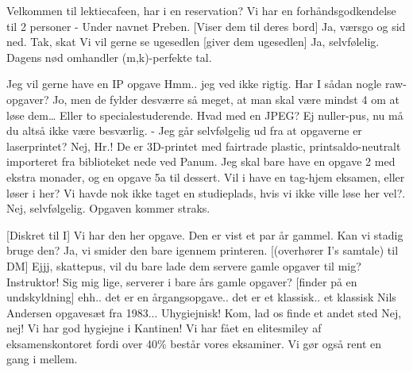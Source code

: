\documentclass[a4paper,11pt]{article}
\begin{document}
\begin{sketch}




 Velkommen til lektiecafeen, har i en reservation?
 Vi har en forhåndsgodkendelse til 2 personer - Under navnet Preben.
[Viser dem til deres bord] Ja, værsgo og sid ned.
 Tak, skat
 Vi vil gerne se ugesedlen
[giver dem ugesedlen] Ja, selvfølelig. Dagens nød omhandler (m,k)-perfekte tal.

 Jeg vil gerne have en IP opgave
 Hmm.. jeg ved ikke rigtig. Har I sådan nogle raw-opgaver?
 Jo, men de fylder desværre så meget, at man skal være mindst 4 om at løse dem\ldots
         Eller to specialestuderende. Hvad med en JPEG?
 Ej nuller-pus, nu må du altså ikke være besværlig. - Jeg går
selvfølgelig ud fra at opgaverne er laserprintet?
 Nej, Hr.! De er 3D-printet med fairtrade plastic, printsaldo-neutralt importeret
         fra biblioteket nede ved Panum.
 Jeg skal bare have en opgave 2 med ekstra monader, og en opgave 5a til dessert.
 Vil i have en tag-hjem eksamen, eller løser i her?
 Vi havde nok ikke taget en studieplads, hvis vi ikke ville løse her vel?.
 Nej, selvfølgelig. Opgaven kommer straks.

[Diskret til I] Vi har den her opgave. Den er vist et par år gammel.
Kan vi stadig bruge den?
Ja, vi smider den bare igennem printeren.
[(overhører I's samtale) til DM] Ejjj, skattepus, vil du bare lade dem
servere gamle opgaver til mig?
 Instruktor! Sig mig lige, serverer i bare års gamle opgaver?
[finder på en undskyldning] ehh.. det er en årgangsopgave.. det er et klassisk..
et klassisk Nils Andersen opgavesæt fra 1983...
Uhygiejnisk! Kom, lad os finde et andet sted
Nej, nej! Vi har god hygiejne i Kantinen! Vi har fået en elitesmiley af
eksamenskontoret fordi over 40\% består vores eksaminer. Vi gør også rent en
gang i mellem.


\end{sketch}
\end{document}
